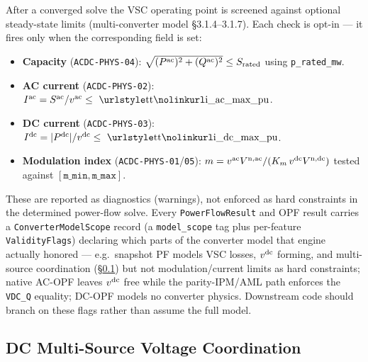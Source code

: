 After a converged solve the VSC operating point is screened against optional
steady-state limits (multi-converter model \S3.1.4--3.1.7).  Each check is
opt-in --- it fires only when the corresponding field is set:
\begin{itemize}
  \item \textbf{Capacity} (\texttt{ACDC-PHYS-04}):
    \(\sqrt{(P^{\mathrm{ac}})^2+(Q^{\mathrm{ac}})^2}\le S_{\mathrm{rated}}\)
    using \texttt{p\_rated\_mw}.
  \item \textbf{AC current} (\texttt{ACDC-PHYS-02}):
    \(I^{\qual{ac}}=S^{\qual{ac}}/v^{\qual{ac}}\le \texttt{i\_ac\_max\_pu}\).
  \item \textbf{DC current} (\texttt{ACDC-PHYS-03}):
    \(I^{\qual{dc}}=|P^{\qual{dc}}|/v^{\qual{dc}}\le \texttt{i\_dc\_max\_pu}\).
  \item \textbf{Modulation index} (\texttt{ACDC-PHYS-01}/\texttt{05}):
    \(m = v^{\mathrm{ac}}V^{\mathrm{n,ac}}/(K_m\,v^{\mathrm{dc}}V^{\mathrm{n,dc}})\)
    tested against \([\texttt{m\_min},\texttt{m\_max}]\).
\end{itemize}
These are reported as diagnostics (warnings), not enforced as hard constraints
in the determined power-flow solve.  Every \texttt{PowerFlowResult} and OPF
result carries a \texttt{ConverterModelScope} record (a \texttt{model\_scope}
tag plus per-feature \texttt{ValidityFlags}) declaring which parts of the
converter model that engine actually honored --- e.g.\ snapshot PF models VSC
losses, \(v^{\mathrm{dc}}\) forming, and multi-source coordination
(\S\ref{sec:pf-dc-coordination}) but not modulation/current limits as hard
constraints; native AC-OPF leaves \(v^{\mathrm{dc}}\) free while the
parity-IPM/AML path enforces the \texttt{VDC\_Q} equality; DC-OPF models no
converter physics.  Downstream code should branch on these flags rather than
assume the full model.

\subsection{DC Multi-Source Voltage Coordination}
\label{sec:pf-dc-coordination}

